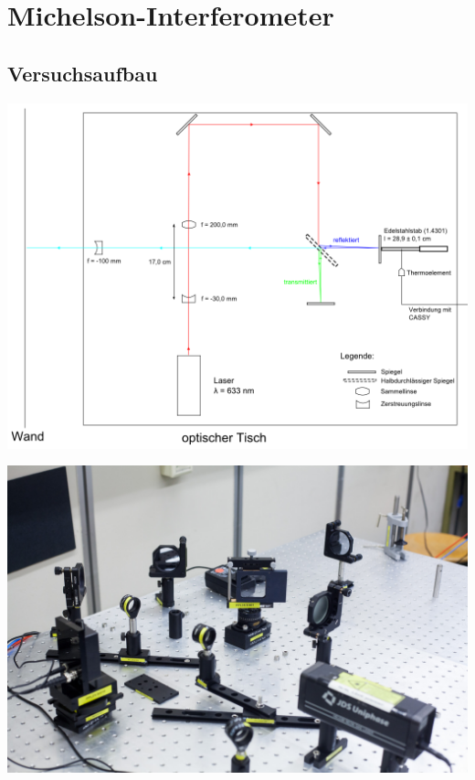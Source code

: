 \section{Michelson-Interferometer}
\subsection*{Versuchsaufbau}
\begin{frame}
	\includegraphics[width=\textwidth]{images/2/zeichnung}
\end{frame}
\begin{frame}
	\includegraphics[width=\textwidth]{images/2/interferrometer-4}
\end{frame}

